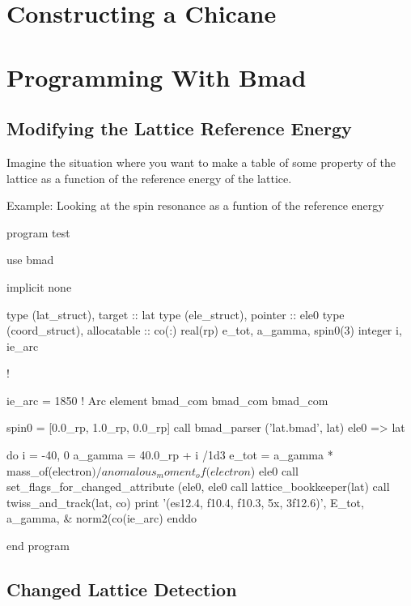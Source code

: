 \documentclass{hitec}     %
\newcommand{\Section}[1]{\section{#1}\vspace*{-1ex}}
\begin{document}
\Section{Constructing a Chicane}
\label{s:chicane}



\Section{Programming With Bmad}
\label{s:bmad.program}

\subsection{Modifying the Lattice Reference Energy}

Imagine the situation where you want to make a table of some property of the lattice as a function
of the reference energy of the lattice. 

Example: Looking at the spin resonance as a funtion of the reference energy

\begin{code}
program test

use bmad

implicit none

type (lat_struct), target :: lat
type (ele_struct), pointer :: ele0
type (coord_struct), allocatable :: co(:)
real(rp) e_tot, a_gamma, spin0(3)
integer i, ie_arc

!

ie_arc = 1850   ! Arc element
bmad_com%
bmad_com%
bmad_com%

spin0 = [0.0_rp, 1.0_rp, 0.0_rp]
call bmad_parser ('lat.bmad', lat)
ele0 => lat%

do i = -40, 0
  a_gamma = 40.0_rp + i /1d3
  e_tot = a_gamma * mass_of(electron$) / anomalous_moment_of(electron$)
  ele0%
  call set_flags_for_changed_attribute (ele0, ele0%
  call lattice_bookkeeper(lat)
  call twiss_and_track(lat, co)
  print '(es12.4, f10.4, f10.3, 5x, 3f12.6)', E_tot, a_gamma, &
                          norm2(co(ie_arc)%
enddo

end program
\end{code}

\subsection{Changed Lattice Detection}
\end{document}
